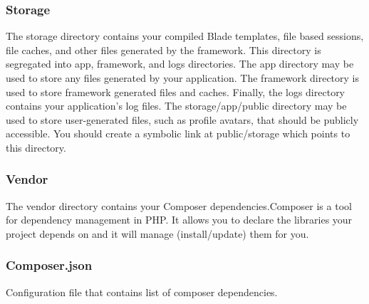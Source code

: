 \documentclass[letterpaper, 10 pt, conference]{ieeeconf}  %
\begin{document}
\begin{center}
\end{center}

\subsubsection{Storage}
The storage directory contains your compiled Blade templates, file based sessions, file caches, and other files generated by the framework. This directory is segregated into app, framework, and logs directories. The app directory may be used to store any files generated by your application. The framework directory is used to store framework generated files and caches. Finally, the logs directory contains your application's log files. The storage/app/public directory may be used to store user-generated files, such as profile avatars, that should be publicly accessible. You should create a symbolic link at public/storage which points to this directory. \\


\begin{center}
\end{center}
\subsubsection{Vendor}
The vendor directory contains your Composer dependencies.Composer is a tool for dependency management in PHP. It allows you to declare the libraries your project depends on and it will manage (install/update) them for you.\\

\subsubsection{Composer.json}
Configuration file that contains list of composer dependencies.
\end{document}
